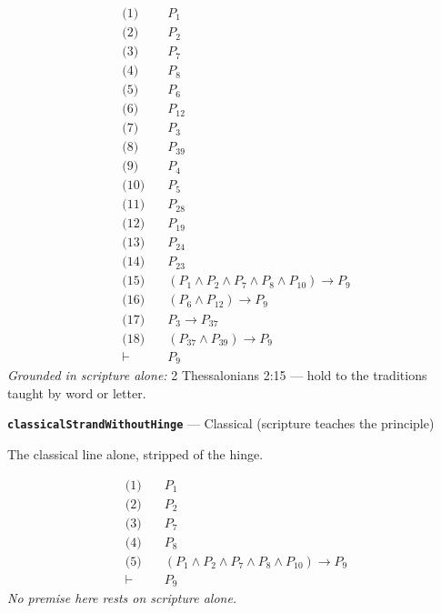 \documentclass[11pt]{article}
\begin{document}
\begin{align*}
  \text{(1)} \quad & P_{1} \\
  \text{(2)} \quad & P_{2} \\
  \text{(3)} \quad & P_{7} \\
  \text{(4)} \quad & P_{8} \\
  \text{(5)} \quad & P_{6} \\
  \text{(6)} \quad & P_{12} \\
  \text{(7)} \quad & P_{3} \\
  \text{(8)} \quad & P_{39} \\
  \text{(9)} \quad & P_{4} \\
  \text{(10)} \quad & P_{5} \\
  \text{(11)} \quad & P_{28} \\
  \text{(12)} \quad & P_{19} \\
  \text{(13)} \quad & P_{24} \\
  \text{(14)} \quad & P_{23} \\
  \text{(15)} \quad & (P_{1} \land P_{2} \land P_{7} \land P_{8} \land P_{10}) \rightarrow P_{9} \\
  \text{(16)} \quad & (P_{6} \land P_{12}) \rightarrow P_{9} \\
  \text{(17)} \quad & P_{3} \rightarrow P_{37} \\
  \text{(18)} \quad & (P_{37} \land P_{39}) \rightarrow P_{9} \\
  \vdash \quad & P_{9}
\end{align*}
\emph{Grounded in scripture alone:} 2 Thessalonians 2:15 — hold to the traditions taught by word or letter.
\par\medskip\noindent\textbf{\texttt{classical\allowbreak{}Strand\allowbreak{}Without\allowbreak{}Hinge}} --- Classical (scripture teaches the principle)\par\nobreak\noindent
The classical line alone, stripped of the hinge.

\begin{align*}
  \text{(1)} \quad & P_{1} \\
  \text{(2)} \quad & P_{2} \\
  \text{(3)} \quad & P_{7} \\
  \text{(4)} \quad & P_{8} \\
  \text{(5)} \quad & (P_{1} \land P_{2} \land P_{7} \land P_{8} \land P_{10}) \rightarrow P_{9} \\
  \vdash \quad & P_{9}
\end{align*}
\emph{No premise here rests on scripture alone.}
\end{document}
